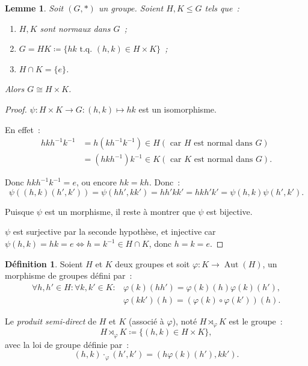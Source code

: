 \documentclass{article}
\newtheorem{lem}[thm]{Lemme}
\theoremstyle{definition}
\newtheorem{déf}[thm]{Définition}
\theoremstyle{remark}
\DeclareMathOperator{\Aut}{Aut}
\newcommand{\tq}{\text{ t.q. }}
\newcommand{\simeqq}{\cong}
\begin{document}
		\begin{lem} Soit $(G, *)$ un groupe. Soient $H, K \leq G$ tels que~:
		\begin{enumerate}
			\item $H, K$ sont normaux dans $G$~;
			\item $G = HK \coloneqq \{hk \tq (h, k) \in H \times K\}$~;
			\item $H \cap K = \{e\}$.
		\end{enumerate}
		Alors $G \simeqq H \times K$.
		\end{lem}

		\begin{proof} $\psi : H \times K \to G : (h, k) \mapsto hk$ est un isomorphisme.

		En effet~:
		\begin{align*}
			hkh^{-1}k^{-1} &= h(kh^{-1}k^{-1}) \in H (\text{ car $H$ est normal dans $G$}) \\
			&= (hkh^{-1})k^{-1} \in K (\text{ car $K$ est normal dans $G$}).
		\end{align*}

		Donc $hkh^{-1}k^{-1} = e$, ou encore $hk = kh$. Donc~:
		\[\psi\left((h, k)(h', k')\right) = \psi(hh', kk') = hh'kk' = hkh'k' = \psi(h, k)\psi(h', k').\]

		Puisque $\psi$ est un morphisme, il reste à montrer que $\psi$ est bijective.

		$\psi$ est surjective par la seconde hypothèse, et injective car $\psi(h, k) = hk = e \iff h=k^{-1} \in H \cap K$, donc $h=k=e$.
		\end{proof}

		\begin{déf} Soient $H$ et $K$ deux groupes et soit $\varphi : K \to \Aut(H)$, un morphisme de groupes défini par~:
		\begin{align*}
			\forall h, h' \in H : \forall k, k' \in K : &\varphi(k)(hh') = \varphi(k)(h)\varphi(k)(h'), \\
			&\varphi(kk')(h) = (\varphi(k) \circ \varphi(k'))(h).
		\end{align*}

		Le \textit{produit semi-direct} de $H$ et $K$ (associé à $\varphi$), noté $H \rtimes_\varphi K$ est le groupe~:
		\[H \rtimes_\varphi K \coloneqq \{(h, k) \in H \times K\},\]
		avec la loi de groupe définie par~:
		\[(h, k) \cdot_\varphi (h', k') = \left(h\varphi(k)(h'), kk'\right).\]
		\end{déf}
\end{document}
